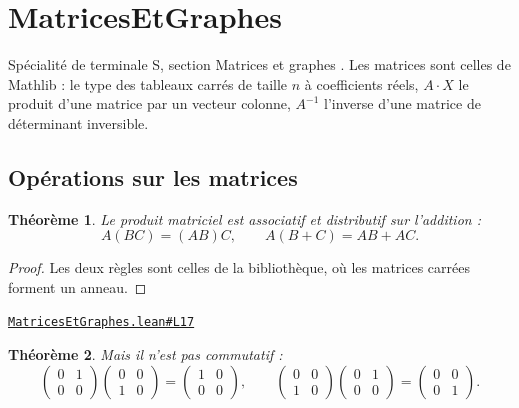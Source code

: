 \documentclass[11pt,a4paper]{article}
\theoremstyle{definition}
\theoremstyle{plain}
\newtheorem{theoreme}{Théorème}
\newcommand{\source}[2]{\par\smallskip\noindent\hfill{\footnotesize\href{#1}{\texttt{#2}}}\par\smallskip}
\begin{document}
\section{MatricesEtGraphes}

\noindent
Spécialité de terminale S, section \og{} Matrices et graphes \fg{}. Les matrices sont
celles de Mathlib : le type des tableaux carrés de taille $n$ à coefficients réels,
$A \cdot X$ le produit d'une matrice par un vecteur colonne, $A^{-1}$ l'inverse d'une
matrice de déterminant inversible.

\subsection{Opérations sur les matrices}

\begin{theoreme}
Le produit matriciel est associatif et distributif sur l'addition :
\[ A(BC) = (AB)C , \qquad A(B + C) = AB + AC . \]
\end{theoreme}

\begin{proof}
Les deux règles sont celles de la bibliothèque, où les matrices carrées forment un anneau.
\end{proof}
\source{https://github.com/Commutator-IO/learn-lean/blob/main/cours/02-lycee/10-specialite-mathematiques-terminale-s/MatricesEtGraphes.lean\#L17}{MatricesEtGraphes.lean\#L17}

\begin{theoreme}
Mais il n'est pas commutatif :
\[ \begin{pmatrix} 0 & 1 \\ 0 & 0 \end{pmatrix}
   \begin{pmatrix} 0 & 0 \\ 1 & 0 \end{pmatrix}
   = \begin{pmatrix} 1 & 0 \\ 0 & 0 \end{pmatrix} ,
   \qquad
   \begin{pmatrix} 0 & 0 \\ 1 & 0 \end{pmatrix}
   \begin{pmatrix} 0 & 1 \\ 0 & 0 \end{pmatrix}
   = \begin{pmatrix} 0 & 0 \\ 0 & 1 \end{pmatrix} . \]
\end{theoreme}
\end{document}
